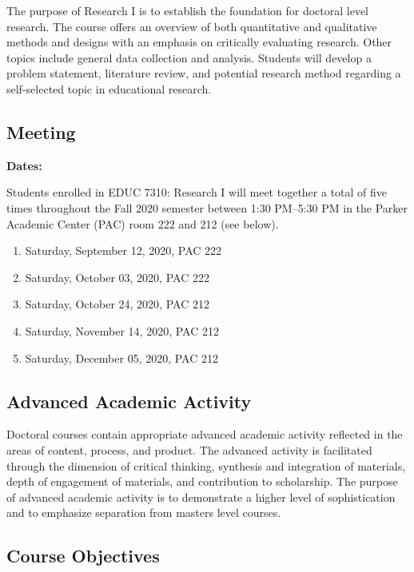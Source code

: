 \documentclass[
]{article}
\providecommand{\tightlist}{%
  \setlength{\itemsep}{0pt}\setlength{\parskip}{0pt}}
\begin{document}
The purpose of Research I is to establish the foundation for doctoral
level research. The course offers an overview of both quantitative and
qualitative methods and designs with an emphasis on critically
evaluating research. Other topics include general data collection and
analysis. Students will develop a problem statement, literature review,
and potential research method regarding a self-selected topic in
educational research.

\subsection{Meeting}

\textbf{Dates:}

Students enrolled in EDUC 7310: Research I will meet together a total of
five times throughout the Fall 2020 semester between 1:30 PM--5:30 PM in
the Parker Academic Center (PAC) room 222 and 212 (see below).

\begin{enumerate}
\def\labelenumi{\arabic{enumi}.}
\tightlist
\item
  Saturday, September 12, 2020, PAC 222
\item
  Saturday, October 03, 2020, PAC 222
\item
  Saturday, October 24, 2020, PAC 212
\item
  Saturday, November 14, 2020, PAC 212
\item
  Saturday, December 05, 2020, PAC 212
\end{enumerate}

\newpage
\subsection{Advanced Academic Activity}

Doctoral courses contain appropriate advanced academic activity
reflected in the areas of content, process, and product. The advanced
activity is facilitated through the dimension of critical thinking,
synthesis and integration of materials, depth of engagement of
materials, and contribution to scholarship. The purpose of advanced
academic activity is to demonstrate a higher level of sophistication and
to emphasize separation from masters level courses.

\subsection{Course Objectives}
\end{document}
